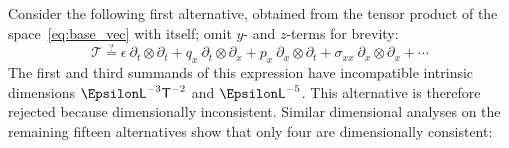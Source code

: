 \documentclass[\ifafour a4paper,12pt,\else a5paper,10pt,\fi%
onecolumn,oneside,article,%
british%
]{memoir}
\theoremstyle{remark}
\theoremstyle{innote}
\newcommand*{\de}{\partialup}%
\newcommand*{\di}{\mathrm{d}}%
\renewcommand*{\|}[1][]{\nonscript\,#1\vert\nonscript\;\mathopen{}}
\newcommand*{\Le}{\textsf{L}}
\newcommand*{\Ti}{\textsf{T}}
\newcommand*{\En}{\Epsilon}%
\newcommand*{\yT}{\bm{\mathcal{T}}}
\newcommand*{\en}{\epsilon}
\newcommand*{\yq}{q}
\newcommand*{\yp}{p}
\newcommand*{\yt}{\sigma}
\begin{document}
Consider the following first alternative, obtained from the tensor product
of the space~\eqref{eq:base_vec} with itself; omit $y$- and $z$-terms for
brevity:
\begin{equation*}
\yT \stackrel{?}{=}    \en\  \de_{t}\otimes\de_{t} +
  \yq_{x}\  \de_{t}\otimes\de_{x} +
  \yp_{x}\  \de_{x}\otimes\de_{t} +
  \yt_{x x}\  \de_{x}\otimes\de_{x} + \dotsb
\end{equation*}
The first and third summands of this expression have incompatible intrinsic
dimensions $\En\Le^{-3}\Ti^{-2}$ and $\En\Le^{-5}$. This alternative is
therefore rejected because dimensionally inconsistent. Similar dimensional
analyses on the remaining fifteen alternatives show that only four are
dimensionally consistent:
\end{document}
